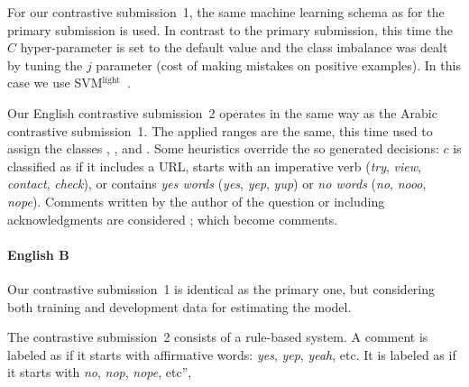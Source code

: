 For our contrastive submission~1, the same machine learning schema as 
for the primary submission is used. In contrast to the primary submission, 
this time the $C$ hyper-parameter is set to the default value and the class 
imbalance was dealt by tuning the $j$ parameter (cost of making mistakes on 
positive examples). In this case we use SVM$^\mathrm{light}$~\cite{Joachims:99}.

Our English contrastive submission~2 operates in the same way as the Arabic 
contrastive submission~1. The applied ranges are the same, this time used to 
assign the classes \good, \pot, and \bad. Some heuristics override the so 
generated decisions: $c$ is classified as \good if it includes a URL, starts 
with an imperative verb (\eg \textit{try}, \textit{view}, \textit{contact}, 
\textit{check}), or contains \textit{yes words} (\eg \textit{yes}, \textit{yep}, 
\textit{yup}) or \textit{no words} (\eg \textit{no}, \textit{nooo}, 
\textit{nope}). Comments written by the author of the question or including 
acknowledgments are considered \dial; which become \bad comments. 


\paragraph{English B}

Our contrastive submission~1 is identical as the primary one, but considering 
both training and development data for estimating the model.
 
 
The contrastive submission~2 consists of a rule-based system. A comment is 
labeled as \yes if it starts with affirmative words: \textit{yes}, \textit{yep}, 
\textit{yeah}, etc.
It is labeled as \no if it starts with \textit{no}, \textit{nop}, 
\textit{nope}, etc”, 




